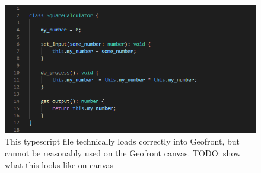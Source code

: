 \begin{figure}
  \centering
  \graphicspath{ {../../assets/images/6/3/} }
  \includegraphics[width=\linewidth]{ugly-oop.png}
  \caption[]{This typescript file technically loads correctly into Geofront, but cannot be reasonably used on the Geofront canvas. TODO: show what this looks like on canvas}
  \label{fig:oop-considered-harmful}
\end{figure}


